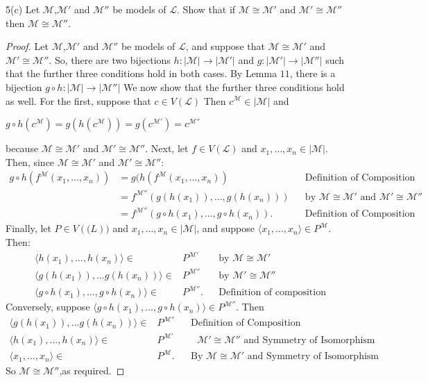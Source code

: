 \documentclass{article}
\begin{document}
5(c) Let $\mathcal{M}$,$\mathcal{M'}$ and $\mathcal{M''}$ be models of $\mathscr{L}$. Show that if $\mathcal{M} \cong \mathcal{M'}$ and $\mathcal{M'} \cong \mathcal{M''}$then $\mathcal{M} \cong \mathcal{M''}$. 
\begin{proof} 
Let $\mathcal{M}$,$\mathcal{M'}$ and $\mathcal{M''}$ be models of $\mathscr{L}$, and suppose that $\mathcal{M} \cong \mathcal{M'}$ and $\mathcal{M'} \cong \mathcal{M''}$. So, there are two bijections $h: | \mathcal{M} | \rightarrow | \mathcal{M'} |$ and $g:  | \mathcal{M'} | \rightarrow | \mathcal{M''}|$ such that the further three conditions hold in both cases. By Lemma $11$, there is a bijection  $g \circ h:  | \mathcal{M}| \rightarrow  | \mathcal{M''}|$ We now show that the further three conditions hold as well. For the first, suppose that $c \in V(\mathscr{L})$ Then $c^\mathcal{M} \in |\mathcal{M}|$ and \begin{center}  $g\circ h(c^\mathcal{M}) = g(h(c^\mathcal{M})) = g(c^\mathcal{M'}) = c^\mathcal{M''}$ \end{center} because 
$\mathcal{M} \cong \mathcal{M'}$ and $\mathcal{M'} \cong \mathcal{M''}$. Next, let $f \in V(\mathscr{L})$ and $x_1, \ldots, x_n \in |\mathcal{M}|$. Then, since $\mathcal{M} \cong \mathcal{M'}$ and $\mathcal{M'} \cong \mathcal{M''}$: 
\begin{align*}
g \circ h(f^\mathcal{M}(x_1, \ldots, x_n)) &= g(h(f^\mathcal{M}(x_1, \ldots, x_n))&&\text{Definition of Composition}\\
&= f^\mathcal{M''}(g(h(x_1)), \ldots,g(h(x_n)))&&\text{by $\mathcal{M} \cong \mathcal{M'}$ and $\mathcal{M'} \cong \mathcal{M''}$}\\
&=  f^\mathcal{M''}(g\circ h(x_1), \ldots,g \circ h(x_n)).&&\text{Definition of Composition}
\end{align*}
Finally, let $P \in V(\mathscr(L))$ and $x_1, \ldots, x_n \in |\mathcal{M}|$, and suppose $\langle x_1, \ldots, x_n \rangle \in P^\mathcal{M}$. Then: 
\begin{align*}
\langle h(x_1), \ldots, h(x_n) \rangle \in &P^\mathcal{M'}&&\text{by $\mathcal{M} \cong \mathcal{M'}$}\\
\langle g(h(x_1)), \ldots g(h(x_n)) \rangle \in &P^\mathcal{M''}&&\text{by  $\mathcal{M'} \cong \mathcal{M''}$}\\
\langle g \circ h(x_1), \ldots, g \circ h(x_n) \rangle \in &P^\mathcal{M''}.&&\text{Definition of composition}
\end{align*}
Conversely, suppose $\langle g \circ h(x_1), \ldots, g \circ h(x_n) \rangle \in P^\mathcal{M''}$. Then 
\begin{align*} 
\langle g(h(x_1)), \ldots g(h(x_n)) \rangle \in &P^\mathcal{M''}&&\text{Definition of Composition}\\
\langle h(x_1), \ldots, h(x_n) \rangle \in &P^\mathcal{M'}&&\text{ $\mathcal{M'} \cong \mathcal{M''}$ and Symmetry of Isomorphism}\\
\langle x_1, \ldots, x_n \rangle \in &P^\mathcal{M}.&&\text{By $\mathcal{M} \cong \mathcal{M'}$ and Symmetry of Isomorphism}
\end{align*}
So $\mathcal{M} \cong \mathcal{M''}$,as required. 
\end{proof}
\end{document}

